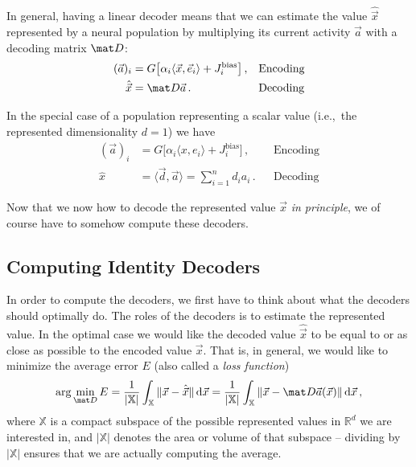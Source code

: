 \documentclass[10pt,letterpaper,oneside]{article}
\begin{document}
In general, having a linear decoder means that we can estimate the value $\hat{\vec x}$ represented by a neural population by multiplying its current activity $\vec a$ with a decoding matrix $\mat D$:
\begin{align*}
	(\vec a)_i &=
		G\big[\alpha_i \langle \vec x, \vec e_i \rangle + J^\mathrm{bias}_i\big] \,, && \text{Encoding} \\
	\hat{\vec x} &= \mat D \vec a \,. && \text{Decoding}
\end{align*}

In the special case of a population representing a scalar value (i.e.,~the represented dimensionality $d = 1$) we have
\begin{align*}
(\vec a)_i &=
G\big[\alpha_i \langle x, e_i \rangle + J^\mathrm{bias}_i\big] \,, && \text{Encoding} \\
\hat{x} &= \langle \vec d, \vec a \rangle = \sum_{i = 1}^n d_i a_i \,. && \text{Decoding}
\end{align*}

Now that we now how to decode the represented value $\vec x$ \emph{in principle}, we of course have to somehow compute these decoders.


\subsection{Computing Identity Decoders}

In order to compute the decoders, we first have to think about what the decoders should optimally do. The roles of the decoders is to estimate the represented value. In the optimal case we would like the decoded value $\hat{\vec x}$ to be equal to or as close as possible to the encoded value $\vec x$. That is, in general, we would like to minimize the average error $E$ (also called a \emph{loss function})
\begin{align}
	\arg\min_{\mat D} E = \frac{1}{|\mathbb{X}|} \int_{\mathbb{X}} \|\vec x - \hat{\vec x}\| \,\mathrm{d}\vec x = \frac{1}{|\mathbb{X}|} \int_{\mathbb{X}} \|\vec x - \mat D \vec a(\vec x)\| \,\mathrm{d}\vec x \,,
	\label{eqn:optimisation_problem}
\end{align}
where $\mathbb{X}$ is a compact subspace of the possible represented values in $\mathbb{R}^d$ we are interested in, and $|\mathbb{X}|$ denotes the area or volume of that subspace -- dividing by $|\mathbb{X}|$ ensures that we are actually computing the average.

\end{document}
